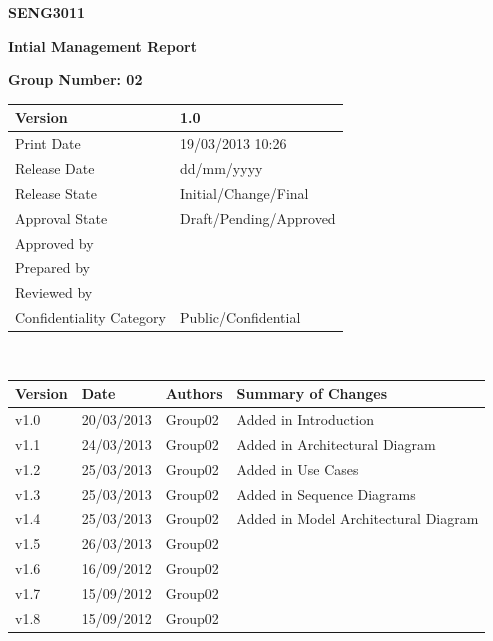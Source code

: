 \documentclass[a4paper]{article}
\begin{document}
\thispagestyle{empty}
\begin {center}
\Large\textbf{SENG3011} 

\Large\textbf{Intial Management Report}

\bigskip\Large\textbf{Group Number: 02}

\end{center}

\vspace*{16.5cm}
\begin{tabular}{|l|l|}
  \hline
  Version         & 1.0\\\hline
  Print Date      & 19/03/2013 10:26\\\hline
  Release Date    & dd/mm/yyyy\\\hline
  Release State   & Initial/Change/Final\\\hline
  Approval State  & Draft/Pending/Approved\\\hline
  Approved by     & \\\hline
  Prepared by     & \\\hline
  Reviewed by     & \\\hline
  Confidentiality Category  & Public/Confidential\\\hline
\end{tabular}
\pagebreak



\thispagestyle{plain}     %
\setcounter{page}{1}      %
\renewcommand{\thepage}{\roman{page}}  %

\\[2ex]
\begin{tabular}{|l|l|l|l|}
  \hline
  Version & Date & Authors & Summary of Changes\\\hline\hline
	v1.0 & 20/03/2013 & Group02 & Added in Introduction           	\\\hline
	v1.1 & 24/03/2013 & Group02 & Added in Architectural Diagram 		\\\hline
	v1.2 & 25/03/2013 & Group02 & Added in Use Cases  		\\\hline
	v1.3 & 25/03/2013 & Group02 & Added in Sequence Diagrams		\\\hline
	v1.4 & 25/03/2013 & Group02 & Added in Model Architectural Diagram 		\\\hline
	v1.5 & 26/03/2013 & Group02 & 		\\\hline
	v1.6 & 16/09/2012 & Group02 &  		\\\hline
	v1.7 & 15/09/2012 & Group02 &  		\\\hline
	v1.8 & 15/09/2012 & Group02 &   		\\\hline
\end{tabular}
\end{document}
